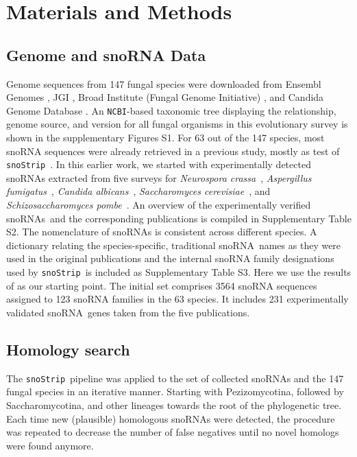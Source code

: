 \documentclass[preprint,3p,times,twocolumn]{elsarticle}
\newcommand{\snos}{snoRNAs}
\newcommand{\sno}{snoRNA}
\newcommand{\snostrip}{\texttt{snoStrip}}
\newcommand{\ncbi}{\texttt{NCBI}}
\newcommand{\Afu}{\emph{Aspergillus fumigatus}}
\newcommand{\Calb}{\emph{Candida albicans}}
\newcommand{\Spo}{\emph{Schizosaccharomyces pombe}}
\newcommand{\Ncr}{\emph{Neurospora crassa}}
\newcommand{\Sce}{\emph{Saccharomyces cerevisiae}}
\begin{document}

\section{Materials and Methods}

\subsection{Genome and snoRNA Data} 

Genome sequences from 147 fungal species were downloaded from Ensembl
Genomes \cite{Kersey:2016}, JGI \cite{Nordberg:2014}, Broad Institute
(Fungal Genome Initiative) , and Candida Genome Database
\cite{Skrzypek:2017}.  An \ncbi-based taxonomic tree displaying the
relationship, genome source, and version for all fungal organisms in
this evolutionary survey is shown in the supplementary Figures S1.
For 63 out of the 147 species, most snoRNA sequences were already
retrieved in a previous study, mostly as test of \snostrip\
\cite{Bartschat:2014}.  In this earlier work, we started with
experimentally detected snoRNAs extracted from five surveys for \Ncr\
\cite{Liu:2009}, \Afu\ \cite{Joechl:2008}, \Calb\
\cite{Mitrovich:2010}, \Sce\ \cite{Piekna-Przybylska:2007}, and \Spo\
\cite{Li:2005}. An overview of the experimentally verified \snos\ and
the corresponding publications is compiled in Supplementary Table
S2. The nomenclature of snoRNAs is consistent across different
species. A dictionary relating the species-specific, traditional \sno\
names as they were used in the original publications and the internal
snoRNA family designations used by \snostrip\ is included as
Supplementary Table S3.  Here we use the results of
\cite{Bartschat:2014} as our starting point.  The initial set comprises
3564 snoRNA sequences assigned to 123 snoRNA families in the 63
species. It includes 231 experimentally validated \sno\ genes taken
from the five publications.

\subsection{Homology search}

The \snostrip\ pipeline \cite{Bartschat:2014} was applied to the set
of collected snoRNAs and the 147 fungal species in an iterative
manner. Starting with Pezizomycotina, followed by Saccharomycotina,
and other lineages towards the root of the phylogenetic tree. Each
time new (plausible) homologous snoRNAs were detected, the procedure
was repeated to decrease the number of false negatives until no novel
homologs were found anymore.
\end{document}
